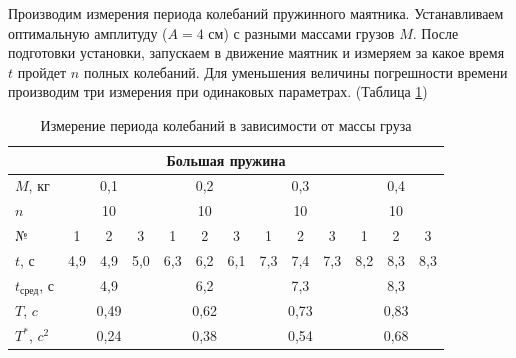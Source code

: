 Производим измерения периода колебаний пружинного маятника. Устанавливаем оптимальную амплитуду ($A = 4\text{ см}$) с разными массами грузов $M$. После подготовки установки, запускаем в движение маятник и измеряем за какое время $t$ пройдет $n$ полных колебаний. Для уменьшения величины погрешности времени производим три измерения при одинаковых параметрах. (Таблица \ref{tabular:measuring_3})

\begin{table}[H]
	\caption{Измерение периода колебаний в зависимости от массы груза}
	\centering
	\label{tabular:measuring_3}
	\begin{tabular}{|l|c|c|c|c|c|c|c|c|c|c|c|c|}
		\hline
		\multicolumn{13}{|c|}{\textbf{Большая пружина}}                                                                                      \\ \hline
		$M$, кг              & \multicolumn{3}{c|}{0,1}  & \multicolumn{3}{c|}{0,2}  & \multicolumn{3}{c|}{0,3}  & \multicolumn{3}{c|}{0,4}  \\ \hline
		$n$                  &  \multicolumn{3}{c|}{10}  &  \multicolumn{3}{c|}{10}  &  \multicolumn{3}{c|}{10}  &  \multicolumn{3}{c|}{10}  \\ \hline
		№                    &  1  &  2  &       3       &  1  &  2  &       3       &  1  &  2  &       3       &  1  &  2  &       3       \\ \hline
		$t$, с               & 4,9 & 4,9 &      5,0      & 6,3 & 6,2 &      6,1      & 7,3 & 7,4 &      7,3      & 8,2 & 8,3 &      8,3      \\ \hline
		$t_{\text{сред}}$, с & \multicolumn{3}{c|}{4,9}  & \multicolumn{3}{c|}{6,2}  & \multicolumn{3}{c|}{7,3}  & \multicolumn{3}{c|}{8,3}  \\ \hline
		$T$, $c$             & \multicolumn{3}{c|}{0,49} & \multicolumn{3}{c|}{0,62} & \multicolumn{3}{c|}{0,73} & \multicolumn{3}{c|}{0,83} \\ \hline
		$T^*$, $c^2$         & \multicolumn{3}{c|}{0,24} & \multicolumn{3}{c|}{0,38} & \multicolumn{3}{c|}{0,54} & \multicolumn{3}{c|}{0,68} \\ \hline
	\end{tabular}
	
	\vspace{0.5cm}
	

\end{table}
